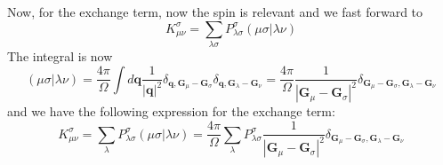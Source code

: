 \documentclass[12pt]{article}
\begin{document}
Now, for the exchange term, now the spin is relevant and we fast forward to
\begin{equation}
    K^{\sigma }_{\mu\nu} = \sum_{\lambda \sigma } P_{\lambda \sigma }^{\sigma } (\mu\sigma | \lambda\nu)
\end{equation}
The integral is now
\begin{equation}
    (\mu\sigma | \lambda\nu) = \frac{4\pi}{\Omega} \int d\mathbf{q} \frac{1}{|\mathbf{q}|^2} \delta_{\mathbf{q}, \mathbf{G}_\mu - \mathbf{G}_\sigma} \delta_{\mathbf{q}, \mathbf{G}_\lambda - \mathbf{G}_\nu} = \frac{4\pi}{\Omega} \frac{1}{|\mathbf{G}_\mu - \mathbf{G}_\sigma|^2} \delta_{\mathbf{G}_\mu - \mathbf{G}_\sigma, \mathbf{G}_\lambda - \mathbf{G}_\nu}
\end{equation}
and we have the following expression for the exchange term:
\begin{equation}
    K^{\sigma }_{\mu\nu} = \sum_{\lambda} P_{\lambda \sigma }^{\sigma } (\mu\sigma | \lambda\nu) = \frac{4\pi}{\Omega} \sum_{\lambda} P_{\lambda \sigma }^{\sigma } \frac{1}{|\mathbf{G}_\mu - \mathbf{G}_\sigma|^2} \delta_{\mathbf{G}_\mu - \mathbf{G}_\sigma, \mathbf{G}_\lambda - \mathbf{G}_\nu}
\end{equation}  
\end{document}
